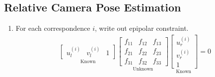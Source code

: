 \subsection{Relative Camera Pose Estimation}
\begin{enumerate}
    \item For each correspondence $i$, write out epipolar constraint. 
    \begin{align*}
        \underset{\text{Known}}{\begin{bmatrix}
            u_{l}^{(i)} & v_{l}^{(i)} & 1
        \end{bmatrix}}
        \underset{\text{Unknown}}{\begin{bmatrix}
            f_{11} & f_{12} & f_{13} \\
            f_{21} & f_{22} & f_{23} \\
            f_{31} & f_{32} & f_{33}
        \end{bmatrix}}
        \underset{\text{Known}}{\begin{bmatrix}
            u_{r}^{(i)} \\
            v_{r}^{(i)} \\
            1
        \end{bmatrix}}=0
    \end{align*}


\end{enumerate}
